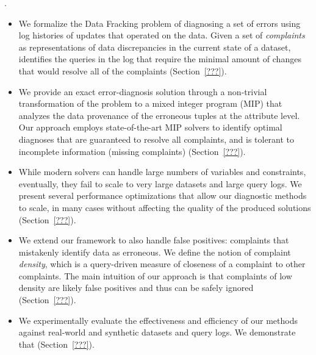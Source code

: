 
.

\begin{itemize}[leftmargin=*, topsep=0mm, itemsep=0mm]      
    \item We formalize the Data Fracking problem of diagnosing a set of errors using log
    histories of updates that operated on the data. Given a set of 
    \emph{complaints} as representations of data discrepancies in the current
    state of a dataset, \sys identifies the queries in the log that require the  minimal
    amount of changes that would resolve all of the complaints (Section~\ref{???}).
      
    \item We provide an exact error-diagnosis solution through a non-trivial
    transformation of the problem to a mixed integer program (MIP) that
    analyzes the data provenance of the erroneous tuples at the attribute
    level. Our approach employs state-of-the-art MIP solvers to identify
    optimal diagnoses that are guaranteed to resolve all complaints, and is
    tolerant to incomplete information (missing complaints)
    (Section~\ref{???}).
    
    \item While modern solvers can handle large numbers of variables and
    constraints, eventually, they fail to scale to very large datasets and
    large query logs. We present several performance optimizations that allow
    our diagnostic methods to scale, in many cases without affecting the
    quality of the produced solutions (Section~\ref{???}).
    
    \item We extend our framework to also handle false positives: complaints
    that mistakenly identify data as erroneous. We define the notion of
    complaint \emph{density}, which is a query-driven measure of closeness of
    a complaint to other complaints. The main intuition of our approach is
    that complaints of low density are likely false positives and thus can be
    safely ignored (Section~\ref{???}).
    
    \item We experimentally evaluate the effectiveness and efficiency of our
    methods against real-world and synthetic datasets and query logs. We
    demonstrate that 
    (Section~\ref{???}).
\end{itemize}


